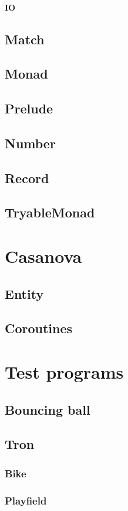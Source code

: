 \begin{multicols}{3}
\subsubsection{IO}
\section{Match}
\section{Monad}
\section{Prelude}
\section{Number}
\section{Record}
\section{TryableMonad}

\chapter{Casanova}
\section{Entity}
\section{Coroutines}

\chapter{Test programs}
\section{Bouncing ball}
\section{Tron}
\subsection{Bike}
\subsection{Playfield}

\end{multicols}
